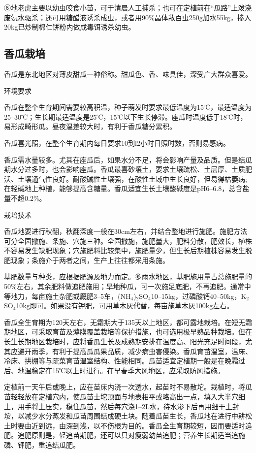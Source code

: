 \documentclass{ctexbook}
\begin{document}
⑥地老虎主要以幼虫咬食小苗，可于清晨人工捕杀；也可在定植前在“瓜路”上泼浇废氨水驱杀；还可用糖醋液诱杀成虫，或者用90\%晶体敌百虫250g加水55kg，掺入20kg已炒制棉仁饼粉内做成毒饵诱杀幼虫。
\subsection{香瓜栽培}
香瓜是东北地区对薄皮甜瓜一种俗称。甜瓜色、香、味具佳，深受广大群众喜爱。

环境要求

香瓜在整个生育期间需要较高积温，种子萌发时要求最低温度为15℃，最适温度为25--30℃；生长期最适温度是25℃，15℃以下生长停滞。座瓜时温度低于18℃时，易形成畸形瓜。昼夜温差较大时，有利于香瓜糖分累积。

香瓜喜光照，在整个生育期内每日要求10到l2小时日照时数，否则易感病。

香瓜需水量较多。尤其在座瓜后，如果水分不足，将会影响产量及品质。但是结瓜期水分过多时，也会影响座瓜。香瓜最喜砂壤土，要求土壤疏松、土层厚、土质肥沃、土壤通气性良好。耐酸碱性土壤强，在酸性土域中生长良好，但易得枯萎病;在轻碱地上种植，能够提高含糖量。香瓜适宜生长土壤酸碱度是pH6--6.8，总含盐量不超0.2\%。

栽培技术

香瓜地要进行秋翻，秋翻深度一般在30cm左右，并结合整地进行施肥。施肥方法可分全园撒施、条施、穴施三种。全园撒施，施肥量大，肥料分散，肥效长，植株不容易发生缺肥现象；穴施肥料比较集中，施肥量少，但生长后期植株容易发生脱肥现象；条施介于两者之间，生产上往往都采用条施。

基肥数量与种类，应根据肥源及地力而定。多雨水地区，基肥施用量占总施肥量的50\%左右，其余肥料做追肥施用；旱地种瓜，可一次施足底肥，不再追肥。通常中等地力，每亩施土杂肥或厩肥3--5车，(NH$_4$)$_2$SO$_4$10--15kg，过磷酸钙40--50kg，K$_2$SO$_4$10kg即可。如果没有钾肥，可用草木灰代替，每亩施草木灰100kg左右。

香瓜全生育期为120天左右，无霜期大于135天以上地区，都可露地栽培。在短无霜期地区，可采取育苗及薄膜覆盖栽培等保护措施，也可选用极早熟品种栽培。但在长生长期地区栽培时，应将香瓜生长及成熟期安排在温度高、阳光充足时间段，尤其应避开雨季，有利于提高瓜瓜果品质，减少病虫害侵染。香瓜育苗温室，温床、冷床、拱棚等与疏菜育苗温室结构、性能相同。瓜苗适宜定植期一般是在晚霜过后、地温稳定在15℃以上时进行。在早春季大风地区，应采取防风措施。

定植前一天午后或晚上，应在苗床内浇一次透水，起苗时不易散坨。栽植时，将瓜苗轻轻放在定植穴内，使瓜苗士坨顶面与地表相平或略高出一点，填入大半穴细土，用手将土压实，稳住瓜苗，然后每穴浇1--2L水，待水渗下后再用细干土封垵，以减少水分蒸发和瓜苗周围结成硬土块。随着瓜苗生长，香瓜地在进行中耕松土时要由近到远，由深到浅，以不伤根为目的。香瓜全生育期较短，因而要适时追肥。追肥原则是，轻追苗期肥，还可以只对瘦弱幼苗追肥；营养生长期适当追施磷、钾肥，重追结瓜肥。
\end{document}
